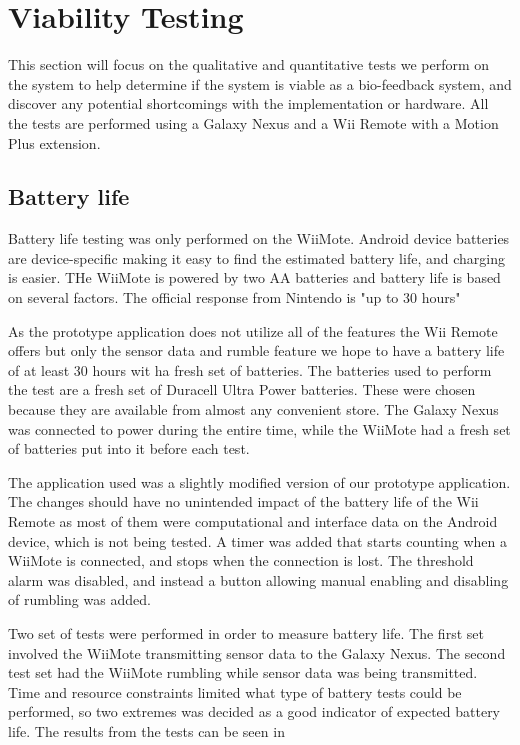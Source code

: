 \chapter{Viability Testing}
This section will focus on the qualitative and quantitative tests we perform on the system to help determine if the system is viable as a bio-feedback system, and discover any potential shortcomings with the implementation or hardware. All the tests are performed using a Galaxy Nexus \cite{galaxyNexus} %
 and a Wii Remote with a Motion Plus extension.

\section{Battery life}
Battery life testing was only performed on the WiiMote. Android device batteries are device-specific making it easy to find the estimated battery life, and charging is easier. THe WiiMote is powered by two AA batteries and battery life is based on several factors. The official response from Nintendo is "up to 30 hours" \cite{wiiBattery} %

As the prototype application does not utilize all of the features the Wii Remote offers but only the sensor data and rumble feature we hope to have a battery life of at least 30 hours wit ha fresh set of batteries. The batteries used to perform the test are a fresh set of Duracell Ultra Power batteries. These were chosen because they are available from almost any convenient store. The Galaxy Nexus was connected to power during the entire time, while the WiiMote had a fresh set of batteries put into it before each test.

The application used was a slightly modified version of our prototype application. The changes should have no unintended impact of the battery life of the Wii Remote as most of them were computational and interface data on the Android device, which is not being tested. A timer was added that starts counting when a WiiMote is connected, and stops when the connection is lost. The threshold alarm was disabled, and instead a button allowing manual enabling and disabling of rumbling was added.

Two set of tests were performed in order to measure battery life. The first set involved the WiiMote transmitting sensor data to the Galaxy Nexus. The second test set had the WiiMote rumbling while sensor data was being transmitted. Time and resource constraints limited what type of battery tests could be performed, so two extremes was decided as a good indicator of expected battery life. The results from the tests can be seen in %

